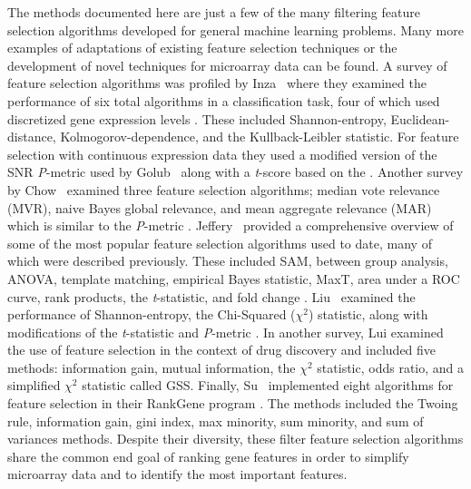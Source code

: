 {The methods documented here are just a few of the many filtering feature
selection algorithms developed for general machine learning problems.  Many
more examples of adaptations of existing feature selection techniques or the
development of novel techniques for microarray data can be found.  A survey of
feature selection algorithms was profiled by Inza \ea\ where they examined the
performance of six total algorithms in a classification task, four of which
used discretized gene expression levels \cite{PMID_15219288}. These included
Shannon-entropy, Euclidean-distance, Kolmogorov-dependence, and the
Kullback-Leibler statistic.  For feature selection with continuous expression
data they used a modified version of the SNR \emph{P}-metric used by Golub \ea\
along with a \emph{t}-score based on the \ttest. Another survey by Chow \ea\
examined three feature selection algorithms; median vote relevance (MVR), naive
Bayes global relevance, and mean aggregate relevance (MAR) which is similar to
the \emph{P}-metric \cite{PMID_11242594}.  Jeffery \ea\ provided a
comprehensive overview of some of the most popular feature selection algorithms
used to date, many of which were described previously.  These included SAM,
between group analysis, ANOVA, template matching, empirical Bayes statistic,
MaxT, area under a ROC curve, rank products, the \emph{t}-statistic, and fold
change \cite{PMID_154652968}.  Liu \ea\ examined the performance of
Shannon-entropy, the Chi-Squared (${\chi}^{2}$) statistic, along with
modifications of the \emph{t}-statistic and \emph{P}-metric
\cite{PMID_14571374}.  In another survey, Lui examined the use of feature
selection in the context of drug discovery and included five methods:
information gain, mutual information, the ${\chi}^{2}$ statistic, odds ratio,
and a simplified ${\chi}^{2}$ statistic called GSS.  Finally, Su \ea\
implemented eight algorithms for feature selection in their RankGene program
\cite{PMID_146536352}.   The methods included the Twoing rule, information
gain, gini index, max minority, sum minority, and sum of variances methods.
Despite their diversity, these filter feature selection algorithms share the 
common end goal of ranking gene features in order to simplify microarray data and to 
identify the most important features.


}
